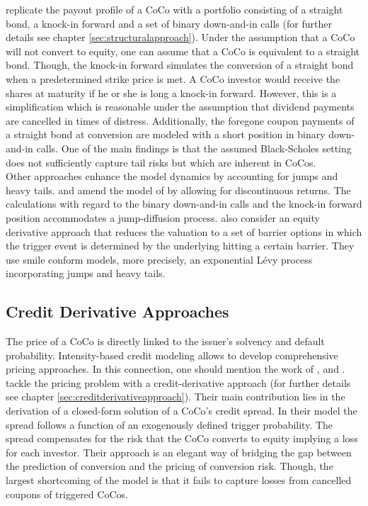 \citet{de2011pricing} replicate the payout profile of a CoCo with a portfolio consisting of a straight bond, a knock-in forward and a set of binary down-and-in calls (for further details see chapter \ref{sec:structuralapproach}). Under the assumption that a CoCo will not convert to equity, one can assume that a CoCo is equivalent to a straight bond. Though, the knock-in forward simulates the conversion of a straight bond when a predetermined strike price is met. A CoCo investor would receive the shares at maturity if he or she is long a knock-in forward. However, this is a simplification which is reasonable under the assumption that dividend payments are cancelled in times of distress. Additionally, the foregone coupon payments of a straight bond at conversion are modeled with a short position in binary down-and-in calls. One of the main findings is that the assumed Black-Scholes setting does not sufficiently capture tail risks but which are inherent in CoCos.\\

Other approaches enhance the model dynamics by accounting for jumps and heavy tails. \citet{erismann2015pricing} and \citet{teneberg2012equity} amend the model of \citet{de2011pricing} by allowing for discontinuous returns. The calculations with regard to the binary down-and-in calls and the knock-in forward position accommodates a jump-diffusion process. \citet{corcuera2013pricing} also consider an equity derivative approach that reduces the valuation to a set of barrier options in which the trigger event is determined by the underlying hitting a certain barrier. They use smile conform models, more precisely, an exponential L\'{e}vy process incorporating jumps and heavy tails.

\subsection*{Credit Derivative Approaches}
The price of a CoCo is directly linked to the issuer's solvency and default probability. Intensity-based credit modeling allows to develop comprehensive pricing approaches. In this connection, one should mention the work of \citet{de2011pricing}, \citet{serjantov2011hybrid} and \citet{erismann2015pricing}. \\

\citet{de2011pricing} tackle the pricing problem with a credit-derivative approach (for further details see chapter \ref{sec:creditderivativeapproach}). Their main contribution lies in the derivation of a closed-form solution of a CoCo's credit spread. In their model the spread follows a function of an exogenously defined trigger probability. The spread compensates for the risk that the CoCo converts to equity implying a loss for each investor. Their approach is an elegant way of bridging the gap between the prediction of conversion and the pricing of conversion risk. Though, the largest shortcoming of the model is that it fails to capture losses from cancelled coupons of triggered CoCos.\\

